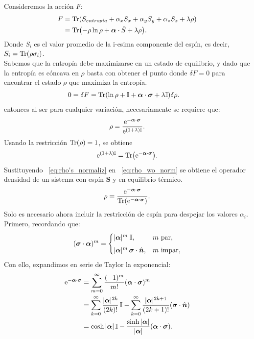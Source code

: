 \documentclass[../Main.tex]{subfiles}
\begin{document}
Consideremos la acción $F$:
\begin{align}
    F
    &=\Tr(S_{entropia}+\alpha_x S_x+\alpha_y S_y+\alpha_z S_z+\lambda \rho)\\
    &=\Tr(-\rho\ln{\rho}+\bm{\alpha}\cdot\Bar{S}+\lambda\rho).
\end{align}
Donde $S_i$ es el valor promedio de la i-esima componente del espín, es decir, $S_i=\Tr(\rho \sigma_i)$.\\
Sabemos que la entropía debe maximizarse en un estado de equilibrio, y dado que la entropía es cóncava en $\rho$ basta con obtener el punto donde $\delta F = 0$ para encontrar el estado $\rho$ que maximiza la entropía.
\begin{align}
0=\delta F
&= \Tr(\ln{\rho}+\mathbb{I}+\bm{\alpha}\cdot \bm{\sigma}+\lambda\mathbb{I})\delta\rho.
\label{eq:multiplicadores}
\end{align}
entonces al ser para cualquier variación, necesariamente se requiere que:
\begin{equation}
    \rho = \frac{\mathrm{e}^{-\bm{\alpha}\cdot \bm{\sigma}}}{\mathrm{e}^{(1+\lambda)\mathbb{I}}}.
    \label{eq:rho_wo_norm}
\end{equation}
Usando la restricción $\Tr(\rho)=1$, se obtiene
\begin{equation}
    \mathrm{e}^{(1+\lambda)\mathbb{I}}=\Tr(\mathrm{e}^{-\bm{\alpha}\cdot\bm{\sigma}}).
    \label{eq:rho's_normaliz}
\end{equation}
Sustituyendo ~\eqref{eq:rho's_normaliz} en ~\eqref{eq:rho_wo_norm} se obtiene el operador densidad de un sistema con espín $\bm{S}$ y en equilibrio térmico.
\begin{equation}
    \rho = \frac{\mathrm{e}^{-\bm{\alpha}\cdot\bm{\sigma}}}{\Tr(\mathrm{e}^{-\bm{\alpha}\cdot\bm{\sigma}})}.
    \label{eq:rho_semifinal}
\end{equation}
Solo es necesario ahora incluir la restricción de espín para despejar los valores $\alpha_i$. Primero, recordando que:
\begin{equation}
(\bm{\sigma}\cdot\bm{\alpha})^{m}
=
\begin{cases}
|\bm{\alpha}|^{m} \;\mathbb{I},
& m \ \text{par}, \\[4pt]
|\bm{\alpha}|^{m}\,
\bm{\sigma}\cdot\hat{\bm{n}},
& m \ \text{impar},
\end{cases}
\end{equation}
Con ello, expandimos en serie de Taylor la exponencial:
\begin{align}
\mathrm{e}^{-\bm{\alpha}\cdot\bm{\sigma}}
&=
\sum_{m=0}^{\infty}
\frac{(-1)^m}{m!}
(\bm{\alpha}\cdot\bm{\sigma})^{m}
\notag \\
&=
\sum_{k=0}^{\infty}
\frac{|\bm{\alpha}|^{2k}}{(2k)!}\,\mathbb{I}
-
\sum_{k=0}^{\infty}
\frac{|\bm{\alpha}|^{2k+1}}{(2k+1)!}
(\bm{\sigma}\cdot\hat{\bm{n}})
\notag \\
&=
\cosh|\bm{\alpha}|\,\mathbb{I}
-
\frac{\sinh|\bm{\alpha}|}{|\bm{\alpha}|}
(\bm{\alpha}\cdot\bm{\sigma}).
\label{eq:expansion_exponencial}
\end{align}
\end{document}
